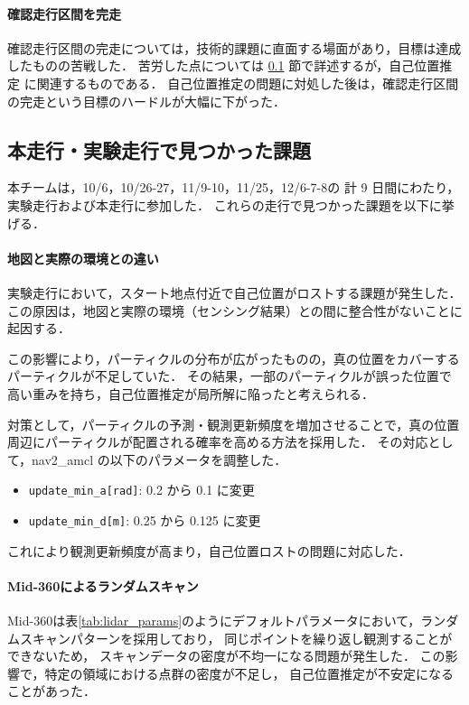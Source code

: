 \documentclass[twocolumn,9pt]{jsproceedings}
\begin{document}
\paragraph{確認走行区間を完走}
確認走行区間の完走については，技術的課題に直面する場面があり，目標は達成したものの苦戦した．
苦労した点については  \ref{sec:4} 節で詳述するが，自己位置推定 に関連するものである．
自己位置推定の問題に対処した後は，確認走行区間の完走という目標のハードルが大幅に下がった．

\subsection{本走行・実験走行で見つかった課題}\label{sec:4}

本チームは，10/6，10/26-27，11/9-10，11/25，12/6-7-8の
計 9 日間にわたり，実験走行および本走行に参加した．
これらの走行で見つかった課題を以下に挙げる．

\paragraph{地図と実際の環境との違い}
実験走行において，スタート地点付近で自己位置がロストする課題が発生した．
この原因は，地図と実際の環境（センシング結果）との間に整合性がないことに起因する．

この影響により，パーティクルの分布が広がったものの，真の位置をカバーするパーティクルが不足していた．
その結果，一部のパーティクルが誤った位置で高い重みを持ち，自己位置推定が局所解に陥ったと考えられる．

対策として，パーティクルの予測・観測更新頻度を増加させることで，真の位置周辺にパーティクルが配置される確率を高める方法を採用した．
その対応として，nav2\_amcl の以下のパラメータを調整した．

\begin{itemize}
  \item \texttt{update\_min\_a[rad]}: 0.2 から 0.1 に変更  
  \item \texttt{update\_min\_d[m]}: 0.25 から 0.125 に変更  
\end{itemize}
これにより観測更新頻度が高まり，自己位置ロストの問題に対応した．

\paragraph{Mid-360によるランダムスキャン}
Mid-360は表\ref{tab:lidar_params}のようにデフォルトパラメータ\cite{mid360param}において，ランダムスキャンパターンを採用しており，
同じポイントを繰り返し観測することができないため，
スキャンデータの密度が不均一になる問題が発生した．
この影響で，特定の領域における点群の密度が不足し，
自己位置推定が不安定になることがあった．
\end{document}
